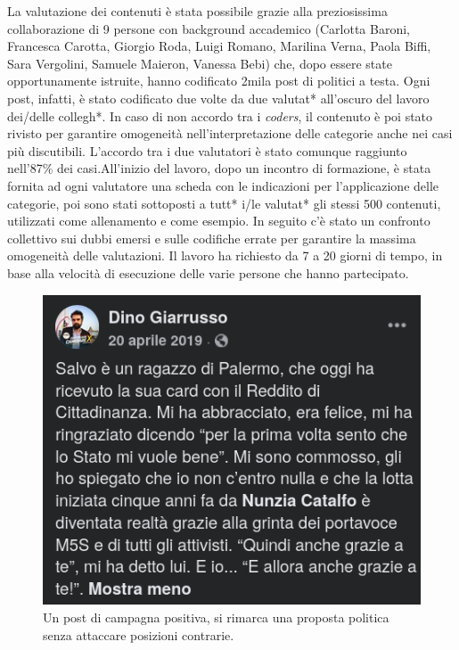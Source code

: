 La valutazione dei contenuti è stata possibile grazie alla preziosissima collaborazione di 9 persone con background accademico (Carlotta Baroni, Francesca Carotta, Giorgio Roda, Luigi Romano, Marilina Verna, Paola Biffi, Sara Vergolini, Samuele Maieron, Vanessa Bebi) che, dopo essere state opportunamente istruite, hanno codificato 2mila post di politici a testa. Ogni post, infatti, è stato codificato due volte da due valutat* all'oscuro del lavoro dei/delle collegh*. In caso di non accordo tra i \textit{coders}, il contenuto è poi stato rivisto per garantire omogeneità nell'interpretazione delle categorie anche nei casi più discutibili. L'accordo tra i due valutatori è stato comunque raggiunto nell’87\% dei casi.All'inizio del lavoro, dopo un incontro di formazione, è stata fornita ad ogni valutatore una scheda con le indicazioni per l'applicazione delle categorie, poi sono stati sottoposti a tutt* i/le valutat* gli stessi 500 contenuti, utilizzati come allenamento e come esempio. In seguito c'è stato un confronto collettivo sui dubbi emersi e sulle codifiche errate per garantire la massima omogeneità delle valutazioni. Il lavoro ha richiesto da 7 a 20 giorni di tempo, in base alla velocità di esecuzione delle varie persone che hanno partecipato.
\begin{figure}
	\includegraphics[width=\linewidth]{figures/positivo}
	\caption{Un post di campagna positiva, si rimarca una proposta politica senza attaccare posizioni contrarie.}
	\label{esempi2}
\end{figure}

